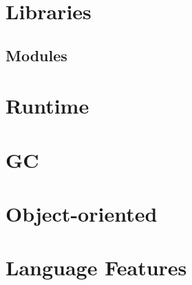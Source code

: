 \documentclass[svgnames,12pt,a4paper]{book}
\begin{document}
  
  
  

  
  
  
  
  
\chapter{Libraries}
  
  

  
  
  
  
  
  
  

  
  
  
  
  
  
  
  
  

  
  
\section{Modules}


\chapter{Runtime}
\label{sec:runtime}



\chapter{GC}
\label{sec:gc}



\chapter{Object-oriented}



\chapter{Language Features}
\label{sec:compl-lang-feat}









\end{document}
